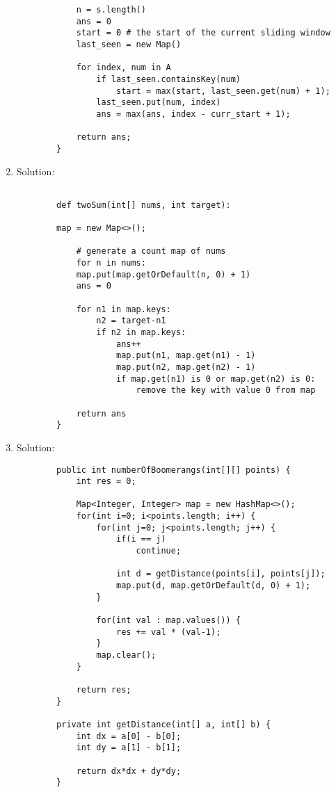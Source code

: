 \documentclass{article}
\begin{document}
\begin{enumerate}
\begin{lstlisting}
            n = s.length()
            ans = 0
            start = 0 # the start of the current sliding window
            last_seen = new Map()

            for index, num in A
                if last_seen.containsKey(num)
                    start = max(start, last_seen.get(num) + 1);
                last_seen.put(num, index)
                ans = max(ans, index - curr_start + 1);

            return ans;
        }
        \end{lstlisting}

        \item Solution:

        \begin{lstlisting}

        def twoSum(int[] nums, int target):

        map = new Map<>();

            # generate a count map of nums
            for n in nums:
            map.put(map.getOrDefault(n, 0) + 1)
            ans = 0

            for n1 in map.keys:
                n2 = target-n1
                if n2 in map.keys:
                    ans++
                    map.put(n1, map.get(n1) - 1)
                    map.put(n2, map.get(n2) - 1)
                    if map.get(n1) is 0 or map.get(n2) is 0:
                        remove the key with value 0 from map

            return ans
        }
        \end{lstlisting}

        \item Solution:

        \begin{lstlisting}
        public int numberOfBoomerangs(int[][] points) {
            int res = 0;

            Map<Integer, Integer> map = new HashMap<>();
            for(int i=0; i<points.length; i++) {
                for(int j=0; j<points.length; j++) {
                    if(i == j)
                        continue;

                    int d = getDistance(points[i], points[j]);
                    map.put(d, map.getOrDefault(d, 0) + 1);
                }

                for(int val : map.values()) {
                    res += val * (val-1);
                }
                map.clear();
            }

            return res;
        }

        private int getDistance(int[] a, int[] b) {
            int dx = a[0] - b[0];
            int dy = a[1] - b[1];

            return dx*dx + dy*dy;
        }

        \end{lstlisting}

    \end{enumerate}
\end{document}

